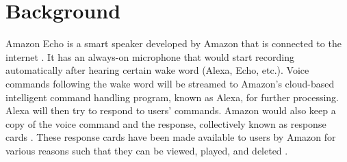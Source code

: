 \section{Background}
Amazon Echo is a smart speaker developed by Amazon that is connected to the internet \cite{wikipedia_2019}. It has an always-on microphone that would start recording automatically after hearing certain wake word (Alexa, Echo, etc.). Voice commands following the wake word will be streamed to Amazon's cloud-based intelligent command handling program, known as Alexa, for further processing. Alexa will then try to respond to users' commands. Amazon would also keep a copy of the voice command and the response, collectively known as response cards \cite{ford2019alexa}. These response cards have been made available to users by Amazon for various reasons such that they can be viewed, played, and deleted \cite{amazon_2010}. 
